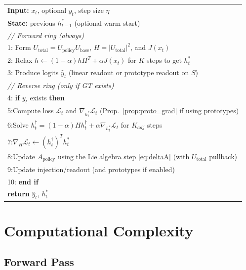 \documentclass[11pt,a4paper]{article}
\newcommand{\LL}{\mathcal{L}}
\begin{document}
\begin{algorithm}[t]
\caption{Online Dual-Loop MQR (O2EP) at Time $t$}
\label{alg:o2ep}
\begin{tabular}{@{}l@{}}
\textbf{Input:} $x_t$, optional $y_t$, step size $\eta$ \\
\textbf{State:} previous $h_{t-1}^*$ (optional warm start) \\[0.3em]
\textit{// Forward ring (always)} \\
1: Form $U_{\text{total}}=U_{\text{policy}}U_{\text{base}}$, $H=|U_{\text{total}}|^2$, and $J(x_t)$ \\
2: Relax $h\leftarrow (1-\alpha)hH^T+\alpha J(x_t)$ for $K$ steps to get $h_t^*$ \\
3: Produce logits $\hat{y}_t$ (linear readout or prototype readout on $S$) \\[0.3em]
\textit{// Reverse ring (only if GT exists)} \\
4: \textbf{if} $y_t$ exists \textbf{then} \\
5:\quad Compute loss $\LL_t$ and $\nabla_{h_t^*}\LL_t$ (Prop.~\ref{prop:proto_grad} if using prototypes) \\
6:\quad Solve $h_t^\dagger=(1-\alpha)Hh_t^\dagger+\alpha\nabla_{h_t^*}\LL_t$ for $K_{adj}$ steps \\
7:\quad $\nabla_H\LL_t \gets (h_t^\dagger)^T h_t^*$ \\
8:\quad Update $A_{\text{policy}}$ using the Lie algebra step \eqref{eq:deltaA} (with $U_{\text{total}}$ pullback) \\
9:\quad Update injection/readout (and prototypes if enabled) \\
10: \textbf{end if} \\
\textbf{return} $\hat{y}_t$, $h_t^*$ \\
\end{tabular}
\end{algorithm}

\section{Computational Complexity}
\label{sec:complexity}

\subsection{Forward Pass}
\end{document}

